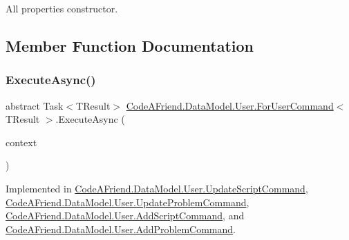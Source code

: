 All properties constructor.



\subsection{Member Function Documentation}
\mbox{\label{class_code_a_friend_1_1_data_model_1_1_user_1_1_for_user_command_aa9abf9da11dd2a573d8ed93bcf53f6df}} 
\subsubsection{\texorpdfstring{Execute\+Async()}{ExecuteAsync()}}
{\footnotesize\ttfamily abstract Task$<$T\+Result$>$ \mbox{\hyperlink{class_code_a_friend_1_1_data_model_1_1_user_1_1_for_user_command}{Code\+A\+Friend.\+Data\+Model.\+User.\+For\+User\+Command}}$<$ T\+Result $>$.Execute\+Async (\begin{DoxyParamCaption}\item[{Db\+Context}]{context }\end{DoxyParamCaption})\hspace{0.3cm}{\ttfamily [pure virtual]}}







Implemented in \mbox{\hyperlink{class_code_a_friend_1_1_data_model_1_1_user_1_1_update_script_command_a54e74e6d68bfc5e01cbcc96fd6dfbd2d}{Code\+A\+Friend.\+Data\+Model.\+User.\+Update\+Script\+Command}}, \mbox{\hyperlink{class_code_a_friend_1_1_data_model_1_1_user_1_1_update_problem_command_ab6deb9c81098f15347a52cff94661c4b}{Code\+A\+Friend.\+Data\+Model.\+User.\+Update\+Problem\+Command}}, \mbox{\hyperlink{class_code_a_friend_1_1_data_model_1_1_user_1_1_add_script_command_a7105f586c7502c18a3ac2cfd567c90f0}{Code\+A\+Friend.\+Data\+Model.\+User.\+Add\+Script\+Command}}, and \mbox{\hyperlink{class_code_a_friend_1_1_data_model_1_1_user_1_1_add_problem_command_a43eff118c9d451d384008fe68559d50d}{Code\+A\+Friend.\+Data\+Model.\+User.\+Add\+Problem\+Command}}.



